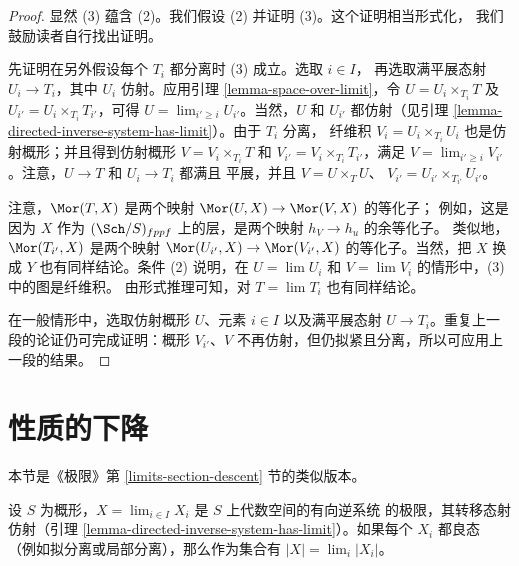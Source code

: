 \begin{proof}
显然 (3) 蕴含 (2)。我们假设 (2) 并证明 (3)。这个证明相当形式化，
我们鼓励读者自行找出证明。

\medskip\noindent
先证明在另外假设每个 $T_i$ 都分离时 (3) 成立。选取 $i\in I$，
再选取满平展态射 $U_i\to T_i$，其中 $U_i$ 仿射。应用引理
\ref{lemma-space-over-limit}，令 $U=U_i\times_{T_i}T$ 及
$U_{i'}=U_i\times_{T_i}T_{i'}$，可得
$U=\lim_{i'\geq i}U_{i'}$。当然，$U$ 和 $U_{i'}$ 都仿射（见引理
\ref{lemma-directed-inverse-system-has-limit}）。由于 $T_i$ 分离，
纤维积 $V_i=U_i\times_{T_i}U_i$ 也是仿射概形；并且得到仿射概形
$V=V_i\times_{T_i}T$ 和 $V_{i'}=V_i\times_{T_i}T_{i'}$，满足
$V=\lim_{i'\geq i}V_{i'}$。注意，$U\to T$ 和 $U_i\to T_i$ 都满且
平展，并且 $V=U\times_TU$、
$V_{i'}=U_{i'}\times_{T_{i'}}U_{i'}$。

注意，$\Mor(T,X)$ 是两个映射 $\Mor(U,X)\to\Mor(V,X)$ 的等化子；
例如，这是因为 $X$ 作为 $(\Sch/S)_{fppf}$ 上的层，是两个映射
$h_V\to h_u$ 的余等化子。%
类似地，$\Mor(T_{i'},X)$ 是两个映射
$\Mor(U_{i'},X)\to\Mor(V_{i'},X)$ 的等化子。当然，把 $X$ 换成 $Y$
也有同样结论。条件 (2) 说明，在 $U=\lim U_i$ 和 $V=\lim V_i$
的情形中，(3) 中的图是纤维积。%
由形式推理可知，对 $T=\lim T_i$ 也有同样结论。

\medskip\noindent
在一般情形中，选取仿射概形 $U$、元素 $i\in I$ 以及满平展态射
$U\to T_i$。重复上一段的论证仍可完成证明：概形 $V_{i'}$、$V$
不再仿射，但仍拟紧且分离，所以可应用上一段的结果。
\end{proof}




\section{性质的下降}
\label{section-descent}

\noindent
本节是《极限》第 \ref{limits-section-descent} 节的类似版本。

\begin{lemma}
\label{lemma-inverse-limit-sets}
设 $S$ 为概形，$X=\lim_{i\in I}X_i$ 是 $S$ 上代数空间的有向逆系统
的极限，其转移态射仿射（引理
\ref{lemma-directed-inverse-system-has-limit}）。如果每个 $X_i$ 都良态
（例如拟分离或局部分离），那么作为集合有 $|X|=\lim_i|X_i|$。
\end{lemma}

